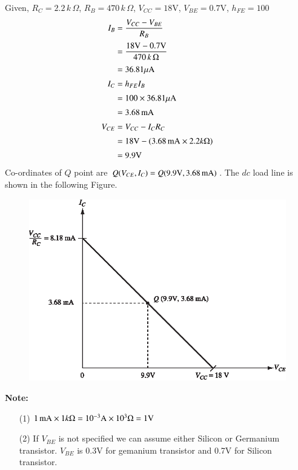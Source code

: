 \begin{solution}
Given, $R_{C}=2.2\, k\,\Omega$, $R_{B}=470\, k\,\Omega$, $V_{CC}=18\text{V}$, $V_{BE}=0.7\text{V}$, $h_{FE}=100$
\begin{align*}
I_{B} &= \frac{V_{CC}-V_{BE}}{R_{B}}\\[2pt]
&= \frac{18\text{V}-0.7\text{V}}{470\,k\,\Omega}\\[2pt]
&= 36.81\mu\text{A}\\[2pt]
I_{C} &= h_{FE}I_{B}\\[2pt]
&= 100\times 36.81 \mu\text{A}\\[2pt]
&= 3.68\text{\,mA}\\[2pt]
V_{CE} &= V_{CC}-I_{C}R_{C}\\[2pt]
&= 18\text{V}-(3.68\text{\,mA}\times 2.2 k\Omega)\\[2pt]
&= 9.9\text{V}
\end{align*}
Co-ordinates of $Q$ point are $Q(V_{CE},I_{C})=Q(9.9\text{V},3.68\text{\,mA})$. The $dc$ load line is shown in the following Figure.
\end{solution}

\begin{figure}[H]
\centering
\includegraphics{chap3/S3-EE-03-IN003.eps}
\end{figure}
\noindent
{\bf Note:}
\begin{itemize}
\item[(1)] $1\text{\,mA}\times 1 k\Omega=10^{-3}\text{A}\times 10^{3}\Omega=1\text{V}$

\item[(2)] If $V_{BE}$ is not specified we can assume either Silicon or Germanium transistor. $V_{BE}$ is $0.3\text{V}$ for gemanium transistor and 0.7V for Silicon transistor.
\end{itemize}

